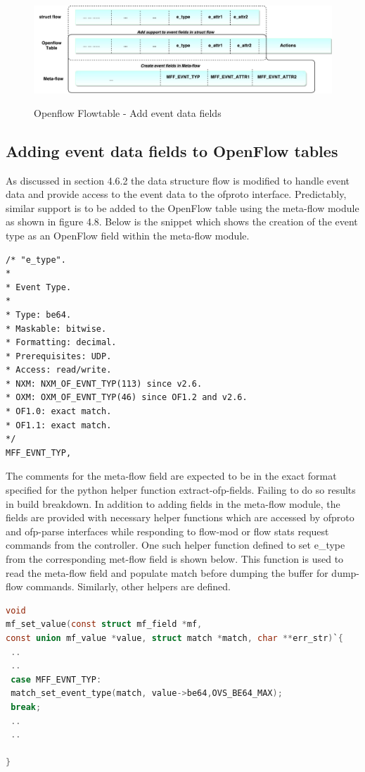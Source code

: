 \begin{figure}[H]
 \centering
 \caption{Openflow Flowtable - Add event data fields}
 \includegraphics[height=4cm]{flowtable.pdf}
\end{figure}

\subsection{Adding event data fields to OpenFlow tables}
 As discussed in section 4.6.2 the data structure flow is modified to handle event data and provide access to the event data to the ofproto interface. Predictably, similar support is to be added to the OpenFlow table using the meta-flow module as shown in figure 4.8. Below is the snippet which shows the creation of the event type as an OpenFlow field within the meta-flow module. \newline

\begin{lstlisting}
/* "e_type".
*
* Event Type.
*
* Type: be64.
* Maskable: bitwise.
* Formatting: decimal.
* Prerequisites: UDP.
* Access: read/write.
* NXM: NXM_OF_EVNT_TYP(113) since v2.6.
* OXM: OXM_OF_EVNT_TYP(46) since OF1.2 and v2.6.
* OF1.0: exact match.
* OF1.1: exact match.
*/    
MFF_EVNT_TYP,
\end{lstlisting}


The comments for the meta-flow field are expected to be in the exact format specified for the python helper function extract-ofp-fields. Failing to do so results in build breakdown. In addition to adding fields in the meta-flow module, the fields are provided with necessary helper functions which are accessed by ofproto and ofp-parse interfaces while responding to flow-mod or flow stats request commands from the controller. One such helper function defined to set e_type from the corresponding met-flow field is shown below. This function is used to read the meta-flow field and populate match before dumping the buffer for dump-flow commands. Similarly, other helpers are defined. \newline
\begin{lstlisting}[language=c]
void
mf_set_value(const struct mf_field *mf,
const union mf_value *value, struct match *match, char **err_str)`{
 ..
 ..
 case MFF_EVNT_TYP:
 match_set_event_type(match, value->be64,OVS_BE64_MAX);
 break; 
 ..
 ..
 
}
\end{lstlisting}

